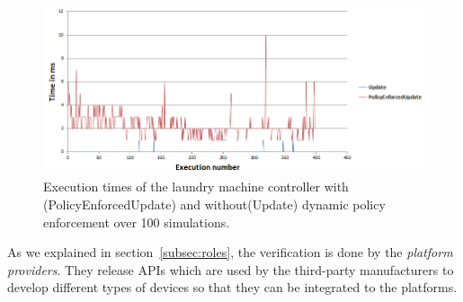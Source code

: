 \documentclass{article}
\begin{document}
\begin{figure}[htpb]
\begin{center}
\includegraphics[scale=0.35, trim = 0 0 0 0]{results_update.png}
\caption{Execution times of the laundry machine controller with (PolicyEnforcedUpdate) and without(Update) dynamic policy enforcement over 100 simulations.}
\label{fig:dynamic}
\end{center}
\end{figure}
As we explained in section~\ref{subsec:roles}, the verification is done by the \textit{platform providers}. They release APIs which are used by the third-party manufacturers to develop different types of devices so that they can be integrated to the platforms.  
\end{document}
